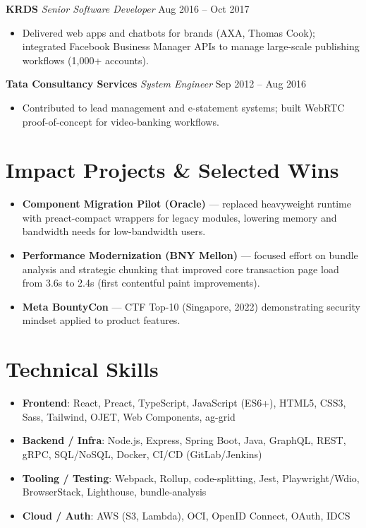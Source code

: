\documentclass[a4paper,10pt]{article}
\begin{document}
\textbf{KRDS} \hfill \textit{Senior Software Developer} \hfill Aug 2016 -- Oct 2017 
\begin{itemize}
  \item Delivered web apps and chatbots for brands (AXA, Thomas Cook); integrated Facebook Business Manager APIs to manage large-scale publishing workflows (1,000+ accounts).
\end{itemize}

\textbf{Tata Consultancy Services} \hfill \textit{System Engineer} \hfill Sep 2012 -- Aug 2016 
\begin{itemize}
  \item Contributed to lead management and e-statement systems; built WebRTC proof-of-concept for video-banking workflows.
\end{itemize}

\section{Impact Projects \& Selected Wins}
\begin{itemize}
  \item \textbf{Component Migration Pilot (Oracle)} — replaced heavyweight runtime with preact-compact wrappers for legacy modules, lowering memory and bandwidth needs for low-bandwidth users.
  \item \textbf{Performance Modernization (BNY Mellon)} — focused effort on bundle analysis and strategic chunking that improved core transaction page load from 3.6s to 2.4s (first contentful paint improvements).
  \item \textbf{Meta BountyCon} — CTF Top-10 (Singapore, 2022) demonstrating security mindset applied to product features.
\end{itemize}

\section{Technical Skills}
\begin{itemize}
  \item \textbf{Frontend}: React, Preact, TypeScript, JavaScript (ES6+), HTML5, CSS3, Sass, Tailwind, OJET, Web Components, ag-grid
  \item \textbf{Backend / Infra}: Node.js, Express, Spring Boot, Java, GraphQL, REST, gRPC, SQL/NoSQL, Docker, CI/CD (GitLab/Jenkins)
  \item \textbf{Tooling / Testing}: Webpack, Rollup, code-splitting, Jest, Playwright/Wdio, BrowserStack, Lighthouse, bundle-analysis
  \item \textbf{Cloud / Auth}: AWS (S3, Lambda), OCI, OpenID Connect, OAuth, IDCS
\end{itemize}
\end{document}
